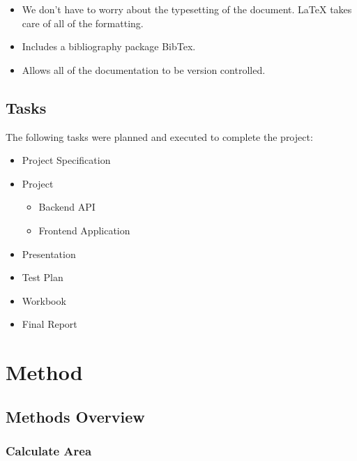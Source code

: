 \documentclass[a4paper,11pt]{article}
\begin{document}
\begin{itemize}
  \item We don't have to worry about the typesetting of the document. \LaTeX{}
    takes care of all of the formatting.
  \item Includes a bibliography package BibTex.
  \item Allows all of the documentation to be version controlled.
\end{itemize}

\subsection{Tasks}

The following tasks were planned and executed to complete the project:

\begin{itemize}
  \item Project Specification
  \item Project
    \begin{itemize}
      \item Backend API
      \item Frontend Application
    \end{itemize}
  \item Presentation
  \item Test Plan
  \item Workbook
  \item Final Report
\end{itemize}


\section{Method}


\subsection{Methods Overview}

\subsubsection{Calculate Area}
\end{document}

